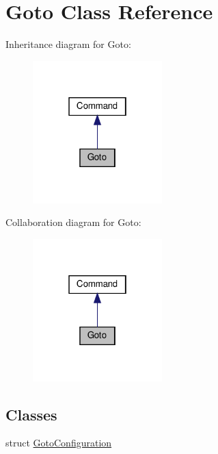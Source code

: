 \hypertarget{classGoto}{}\section{Goto Class Reference}
\label{classGoto}


Inheritance diagram for Goto\+:
\nopagebreak
\begin{figure}[H]
\begin{center}
\leavevmode
\includegraphics[width=142pt]{classGoto__inherit__graph}
\end{center}
\end{figure}


Collaboration diagram for Goto\+:
\nopagebreak
\begin{figure}[H]
\begin{center}
\leavevmode
\includegraphics[width=142pt]{classGoto__coll__graph}
\end{center}
\end{figure}
\subsection*{Classes}
\begin{DoxyCompactItemize}
\item 
struct \hyperlink{structGoto_1_1GotoConfiguration}{Goto\+Configuration}
\end{DoxyCompactItemize}
